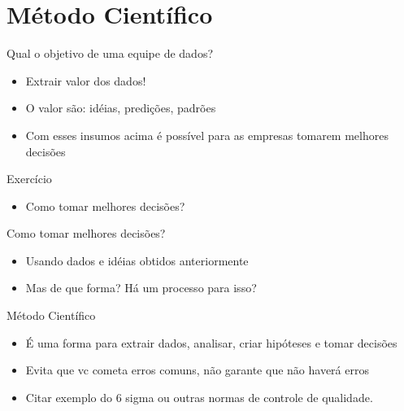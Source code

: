 \section{Método Científico}


\begin{frame}
	\begin{block}{Qual o objetivo de uma equipe de dados?}
		 \begin{itemize}
			  \item Extrair valor dos dados!
			  \item O valor são: idéias, predições, padrões
			  \item Com esses insumos acima é possível para as empresas tomarem melhores decisões
		  \end{itemize}
	\end{block}
\end{frame}


\begin{frame}
	\begin{block}{Exercício}
		 \begin{itemize}
			  \item Como tomar melhores decisões?
		  \end{itemize}
	\end{block}
\end{frame}


\begin{frame}
	\begin{block}{Como tomar melhores decisões?}
		 \begin{itemize}
			  \item Usando dados e idéias obtidos anteriormente
			  \item Mas de que forma? Há um processo para isso?
		  \end{itemize}
	\end{block}
\end{frame}


\begin{frame}
	\begin{block}{Método Científico}
		 \begin{itemize}
			  \item É uma forma para extrair dados, analisar, criar hipóteses e tomar decisões
			  \item Evita que vc cometa erros comuns, não garante que não haverá erros
			  \item Citar exemplo do $6$ sigma ou outras normas de controle de qualidade.
		  \end{itemize}
	\end{block}
\end{frame}


